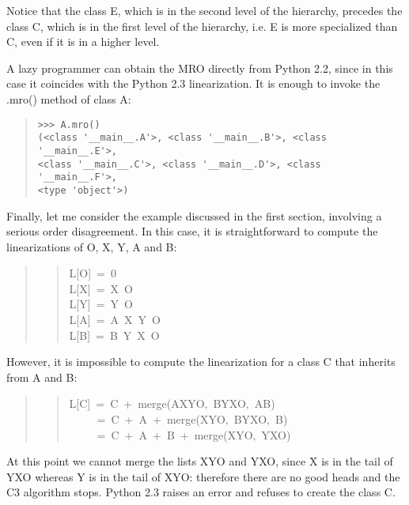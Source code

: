\documentclass[10pt,a4paper,english]{article}
\begin{document}
Notice that the class E, which is in the second level of the hierarchy,
precedes the class C, which is in the first level of the hierarchy, i.e.
E is more specialized than C, even if it is in a higher level.

A lazy programmer can obtain the MRO directly from Python 2.2, since in
this case it coincides with the Python 2.3 linearization.  It is enough
to invoke the .mro() method of class A:
\begin{quote}
\begin{verbatim}>>> A.mro()
(<class '__main__.A'>, <class '__main__.B'>, <class '__main__.E'>,
<class '__main__.C'>, <class '__main__.D'>, <class '__main__.F'>,
<type 'object'>)\end{verbatim}
\end{quote}

Finally, let me consider the example discussed in the first section,
involving a serious order disagreement.  In this case, it is
straightforward to compute the linearizations of O, X, Y, A and B:
\begin{quote}
\begin{quote}{\ttfamily \raggedright \noindent
L{[}O]~=~0~\\
L{[}X]~=~X~O~\\
L{[}Y]~=~Y~O~\\
L{[}A]~=~A~X~Y~O~\\
L{[}B]~=~B~Y~X~O
}\end{quote}
\end{quote}

However, it is impossible to compute the linearization for a class C
that inherits from A and B:
\begin{quote}
\begin{quote}{\ttfamily \raggedright \noindent
L{[}C]~=~C~+~merge(AXYO,~BYXO,~AB)~\\
~~~~~=~C~+~A~+~merge(XYO,~BYXO,~B)~\\
~~~~~=~C~+~A~+~B~+~merge(XYO,~YXO)
}\end{quote}
\end{quote}

At this point we cannot merge the lists XYO and YXO, since X is in the
tail of YXO whereas Y is in the tail of XYO:  therefore there are no
good heads and the C3 algorithm stops.  Python 2.3 raises an error and
refuses to create the class C.


\hspace*{\fill}\hrulefill\hspace*{\fill}
\end{document}
